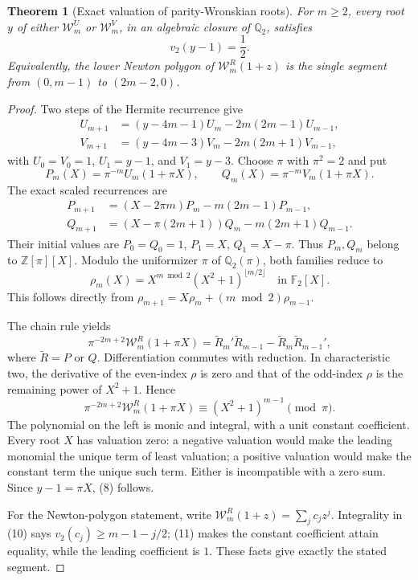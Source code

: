 \documentclass[11pt]{article}
\newtheorem{theorem}{Theorem}
\theoremstyle{remark}\newtheorem{remark}[theorem]{Remark}
\newcommand{\Q}{\mathbb{Q}}
\newcommand{\Z}{\mathbb{Z}}
\newcommand{\F}{\mathbb{F}}
\begin{document}
\begin{theorem}[Exact valuation of parity-Wronskian roots]
\label{thm:valuation}
For $m\geq2$, every root $y$ of either $\mathcal W_m^U$ or
$\mathcal W_m^V$, in an algebraic closure of $\Q_2$, satisfies
\[
\boxed{v_2(y-1)=\frac12.}
\tag{8}
\]
Equivalently, the lower Newton polygon of
$\mathcal W_m^R(1+z)$ is the single segment from $(0,m-1)$ to
$(2m-2,0)$.
\end{theorem}

\begin{proof}
Two steps of the Hermite recurrence give
\begin{align*}
U_{m+1}&=(y-4m-1)U_m-2m(2m-1)U_{m-1},\\
V_{m+1}&=(y-4m-3)V_m-2m(2m+1)V_{m-1},
\end{align*}
with $U_0=V_0=1$, $U_1=y-1$, and $V_1=y-3$.
Choose $\pi$ with $\pi^2=2$ and put
\[
P_m(X)=\pi^{-m}U_m(1+\pi X),\qquad
Q_m(X)=\pi^{-m}V_m(1+\pi X).
\]
The exact scaled recurrences are
\begin{align*}
P_{m+1}&=(X-2\pi m)P_m-m(2m-1)P_{m-1},\\
Q_{m+1}&=(X-\pi(2m+1))Q_m-m(2m+1)Q_{m-1}.
\end{align*}
Their initial values are $P_0=Q_0=1$, $P_1=X$, $Q_1=X-\pi$.
Thus $P_m,Q_m$ belong to $\Z[\pi][X]$. Modulo the uniformizer
$\pi$ of $\Q_2(\pi)$, both families reduce to
\[
\rho_m(X)=X^{m\bmod2}(X^2+1)^{\lfloor m/2\rfloor}
\quad\text{in }\F_2[X].
\tag{9}
\]
This follows directly from
$\rho_{m+1}=X\rho_m+(m\bmod2)\rho_{m-1}$.

The chain rule yields
\[
\pi^{-2m+2}\mathcal W_m^R(1+\pi X)
=\widetilde R_m'\widetilde R_{m-1}
 -\widetilde R_m\widetilde R_{m-1}',
\tag{10}
\]
where $\widetilde R=P$ or $Q$. Differentiation commutes with
reduction. In characteristic two, the derivative of the even-index
$\rho$ is zero and that of the odd-index $\rho$ is the remaining
power of $X^2+1$. Hence
\[
\pi^{-2m+2}\mathcal W_m^R(1+\pi X)
\equiv (X^2+1)^{m-1}\pmod\pi.
\tag{11}
\]
The polynomial on the left is monic and integral, with a unit constant
coefficient. Every root $X$ has valuation zero: a negative valuation
would make the leading monomial the unique term of least valuation;
a positive valuation would make the constant term the unique such
term. Either is incompatible with a zero sum.
Since $y-1=\pi X$, (8) follows.

For the Newton-polygon statement, write
$\mathcal W_m^R(1+z)=\sum_j c_jz^j$.
Integrality in (10) says
$v_2(c_j)\geq m-1-j/2$; (11) makes the constant coefficient
attain equality, while the leading coefficient is $1$.
These facts give exactly the stated segment.
\end{proof}
\end{document}
